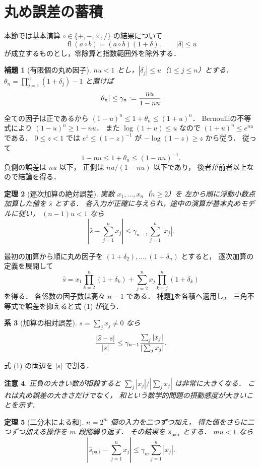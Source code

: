 \documentclass[a5paper,10pt,onecolumn]{jsarticle}
\makeatletter
\theoremstyle{mathnotetheorem}
\newtheorem{theorem}{定理}[section]
\newtheorem{lemma}[theorem]{補題}
\newtheorem{corollary}[theorem]{系}
\newtheorem{remark}[theorem]{注意}
\renewcommand{\proofname}{証明}
\renewenvironment{proof}[1][\proofname]{%
  \par\pushQED{\qed}\normalfont\topsep4\p@\@plus2\p@\relax
  \trivlist\item[\hskip\labelsep\bfseries #1]\ignorespaces
}{\popQED\endtrivlist\@endpefalse}
\makeatother
\begin{document}
\section{丸め誤差の蓄積}
本節では基本演算 $\circ\in\{+,-,\times,/\}$ の結果について
\[
 \operatorname{fl}(a\circ b)=(a\circ b)(1+\delta),
 \qquad |\delta|\le u
\]
が成立するものとし，零除算と指数範囲外を除外する．
\begin{lemma}[有限個の丸め因子]\label{lem:gamma}
$nu<1$ とし，$|\delta_j|\le u$（$1\le j\le n$）とする．
$\theta_n=\prod_{j=1}^n(1+\delta_j)-1$ と置けば
\[
 |\theta_n|\le\gamma_n:={nu\over1-nu}.
\]
\end{lemma}
\begin{proof}
全ての因子は正であるから
$(1-u)^n\le1+\theta_n\le(1+u)^n$．
Bernoulliの不等式により $(1-u)^n\ge1-nu$．
また $\log(1+u)\le u$ なので
$(1+u)^n\le e^{nu}$ である．
$0\le z<1$ では
$e^z\le(1-z)^{-1}$ が
$-\log(1-z)\ge z$ から従う．
従って
\[
 1-nu\le1+\theta_n\le(1-nu)^{-1}.
\]
負側の誤差は $nu$ 以下，
正側は $nu/(1-nu)$ 以下であり，
後者が前者以上なので結論を得る．
\end{proof}
\begin{theorem}[逐次加算の絶対誤差]\label{thm:sum}
実数 $x_1,\dots,x_n$（$n\ge2$）を
左から順に浮動小数点加算した値を $\widehat s$ とする．
各入力が正確に与えられ，途中の演算が基本丸めモデルに従い，
$(n-1)u<1$ なら
\[
 \left|\widehat s-\sum_{j=1}^nx_j\right|
 \le\gamma_{n-1}\sum_{j=1}^n|x_j|.
 \tag{1}
\]
\end{theorem}
\begin{proof}
最初の加算から順に丸め因子を
$(1+\delta_2),\dots,(1+\delta_n)$ とすると，
逐次加算の定義を展開して
\[
 \widehat s=
 x_1\prod_{k=2}^n(1+\delta_k)+
 \sum_{j=2}^n x_j\prod_{k=j}^n(1+\delta_k)
\]
を得る．
各係数の因子数は高々 $n-1$ である．
補題\ref{lem:gamma}を各積へ適用し，
三角不等式で誤差を抑えると式 (1) が従う．
\end{proof}
\begin{corollary}[加算の相対誤差]
$s=\sum_jx_j\ne0$ なら
\[
 {|\widehat s-s|\over|s|}
 \le\gamma_{n-1}{\sum_j|x_j|\over|\sum_jx_j|}.
\]
\end{corollary}
\begin{proof}
式 (1) の両辺を $|s|$ で割る．
\end{proof}
\begin{remark}
正負の大きい数が相殺すると
$\sum_j|x_j|/|\sum_jx_j|$ は非常に大きくなる．
これは丸め誤差の大きさだけでなく，
和という数学的問題の摂動感度が大きいことを示す．
\end{remark}
\begin{theorem}[二分木による和]\label{thm:pairwise}
$n=2^m$ 個の入力を二つずつ加え，
得た値をさらに二つずつ加える操作を $m$ 段階繰り返す．
その結果を $\widehat s_{\mathrm{pair}}$ とする．
$mu<1$ なら
\[
 \left|\widehat s_{\mathrm{pair}}-\sum_{j=1}^nx_j\right|
 \le\gamma_m\sum_{j=1}^n|x_j|.
\]
\end{theorem}
\end{document}

